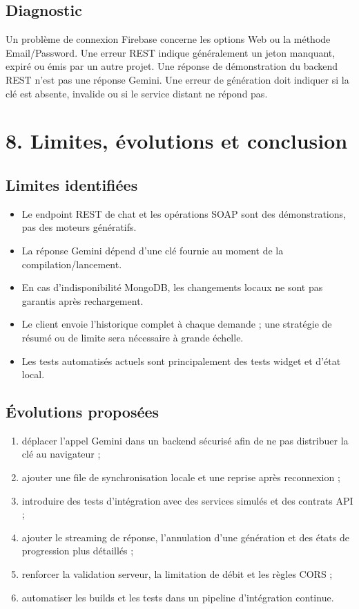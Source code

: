 \documentclass[10pt,a4paper]{article}
\newcommand{\file}[1]{\texttt{\detokenize{#1}}}
\begin{document}
\subsection*{Diagnostic}
Un problème de connexion Firebase concerne les options Web ou la méthode Email/Password. Une erreur REST \file{401} indique généralement un jeton manquant, expiré ou émis par un autre projet. Une réponse de démonstration du backend REST n'est pas une réponse Gemini. Une erreur de génération doit indiquer si la clé est absente, invalide ou si le service distant ne répond pas.

\newpage
\section*{8. Limites, évolutions et conclusion}

\subsection*{Limites identifiées}
\begin{itemize}
  \item Le endpoint REST de chat et les opérations SOAP sont des démonstrations, pas des moteurs génératifs.
  \item La réponse Gemini dépend d'une clé fournie au moment de la compilation/lancement.
  \item En cas d'indisponibilité MongoDB, les changements locaux ne sont pas garantis après rechargement.
  \item Le client envoie l'historique complet à chaque demande ; une stratégie de résumé ou de limite sera nécessaire à grande échelle.
  \item Les tests automatisés actuels sont principalement des tests widget et d'état local.
\end{itemize}

\subsection*{Évolutions proposées}
\begin{enumerate}
  \item déplacer l'appel Gemini dans un backend sécurisé afin de ne pas distribuer la clé au navigateur ;
  \item ajouter une file de synchronisation locale et une reprise après reconnexion ;
  \item introduire des tests d'intégration avec des services simulés et des contrats API ;
  \item ajouter le streaming de réponse, l'annulation d'une génération et des états de progression plus détaillés ;
  \item renforcer la validation serveur, la limitation de débit et les règles CORS ;
  \item automatiser les builds et les tests dans un pipeline d'intégration continue.
\end{enumerate}
\end{document}
